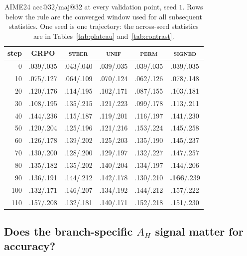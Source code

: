 \documentclass[11pt]{article}
\newcommand{\AH}{A_{H}}
\begin{document}
\begin{table}[t]
\centering
\footnotesize
\setlength{\tabcolsep}{2.6pt}
\begin{tabular}{@{}rccccc@{}}
\toprule
step & GRPO & \textsc{steer} & \textsc{unif} & \textsc{perm} & \textsc{signed} \\
\midrule
0   & .039/.035 & .043/.040 & .039/.035 & .039/.035 & .039/.035 \\
10  & .075/.127 & .064/.109 & .070/.124 & .062/.126 & .078/.148 \\
20  & .120/.176 & .114/.195 & .102/.171 & .087/.155 & .103/.181 \\
30  & .108/.195 & .135/.215 & .121/.223 & .099/.178 & .113/.211 \\
\midrule
40  & .144/.236 & .115/.187 & .119/.201 & .116/.197 & .141/.230 \\
50  & .120/.204 & .125/.196 & .121/.216 & .153/.224 & .145/.258 \\
60  & .126/.178 & .139/.202 & .125/.203 & .135/.190 & .145/.237 \\
70  & .130/.200 & .128/.200 & .129/.197 & .132/.227 & .147/.257 \\
80  & .135/.182 & .135/.202 & .140/.204 & .134/.197 & .144/.206 \\
90  & .136/.191 & .144/.212 & .142/.178 & .130/.210 & \textbf{.166}/.239 \\
100 & .132/.171 & .146/.207 & .134/.192 & .144/.212 & .157/.222 \\
110 & .157/.208 & .132/.181 & .140/.171 & .152/.218 & .151/.230 \\
\bottomrule
\end{tabular}
\caption{AIME24 $\mathrm{acc@}32/\mathrm{maj@}32$ at every validation point, seed
$1$. Rows below the rule are the converged window used for all subsequent
statistics. One seed is one trajectory: the across-seed statistics are in
Tables~\ref{tab:plateau} and~\ref{tab:contrast}.}
\label{tab:curve}
\end{table}

\subsection{Does the branch-specific $\AH$ signal matter for accuracy?}
\label{sec:res:contrasts}
\end{document}
